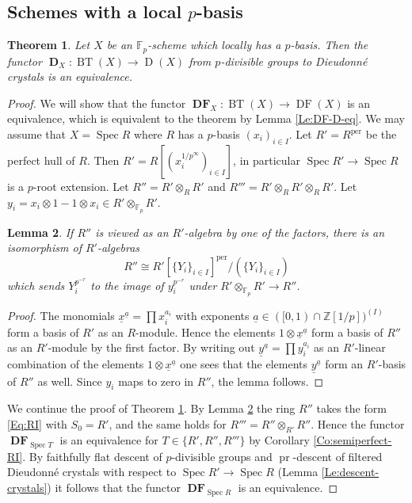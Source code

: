 \documentclass[a4paper,11pt]{article}
\theoremstyle{plain}
\newtheorem{Lemma}{Lemma}
\newtheorem{Thm}[Lemma]{Theorem}
\theoremstyle{definition}
\theoremstyle{remark}
\theoremstyle{definition}
\numberwithin{Lemma}{section}
\numberwithin{Subpoint}{Lemma}
\numberwithin{equation}{section}
\newcommand{\DD}{{\mathbb{D}}}
\newcommand{\FF}{{\mathbb{F}}}
\newcommand{\ZZ}{{\mathbb{Z}}}
\DeclareMathOperator{\BT}{BT}
\DeclareMathOperator{\Dcat}{D}
\DeclareMathOperator{\Dfun}{\mathbf D} %
\DeclareMathOperator{\DFcat}{DF}
\DeclareMathOperator{\DFfun}{\mathbf{DF}} %
\DeclareMathOperator{\Spec}{Spec}
\DeclareMathOperator{\per}{per}
\newcommand{\nameoftop}{{\operatorname{pr}}}
\renewcommand{\u}{\underline}
\newcommand{\chang}[1]{{#1}}
\begin{document}
\subsection{Schemes with a local $p$-basis}

\begin{Thm}
\label{Th:eq-p-basis}
\chang{Let $X$ be an $\FF_p$-scheme which locally has a $p$-basis.}
Then the functor
\chang{$\Dfun_X:\BT(X)\to\Dcat(X)$}
from $p$-divisible groups to Dieudonn\'e crystals is an equivalence.
\end{Thm}

\begin{proof}
\chang{We will show that the functor $\DFfun_X:\BT(X)\to\DFcat(X)$ is an equivalence, which is equivalent to the theorem by Lemma \ref{Le:DF-D-eq}.}
We may assume that $X=\Spec R$ where $R$ has a $p$-basis $(x_i)_{i\in I}$.
Let $R'=R^{\per}$ be the perfect hull of $R$.
Then $R'=R[(x_i^{1/p^\infty})_{i\in I}]$,
in particular $\Spec R'\to\Spec R$ is a $p$-root extension.
Let $R''=R'\otimes_RR'$ and $R'''=R'\otimes_RR'\otimes_RR'$.
Let $y_i=x_i\otimes 1-1\otimes x_i\in R'\otimes_{\FF_p} R'$.

\begin{Lemma}
\label{Le:R''-RI}
If $R''$ is viewed as an $R'$-algebra by one of the factors,
there is an isomorphism of $R'$-algebras
\[
R''\cong R'[\{Y_i\}_{i\in I}]^{\per}/(\{Y_i\}_{i\in I})
\]
which sends $Y_i^{p^{-r}}$ to the image of $y_i^{p^{-r}}$ 
under $R'\otimes_{\FF_p} R'\to R''$.
\end{Lemma}

\begin{proof}
The monomials $\u x^{\u a}=\prod x_i^{a_i}$ %
with exponents $\u a\in ([0,1)\cap\ZZ[1/p])^{(I)}$ %
form a basis of $R'$ as an $R$-module.
Hence the elements $1\otimes\u x^{\u a}$ form a basis of $R''$
as an $R'$-module by the first factor.
By writing out $\u y^{\u a}=\prod y_i^{a_i}$ as an $R'$-linear combination
of the elements $1\otimes\u x^{\u a}$ one sees that
the elements $\u y^{\u a}$ form an $R'$-basis of $R''$ as well.
Since $y_i$ maps to zero in $R''$, the lemma follows.
\end{proof}

We continue the proof of Theorem \ref{Th:eq-p-basis}.
By Lemma \ref{Le:R''-RI}
the ring $R''$ takes the form \eqref{Eq:RI} with $S_0=R'$,
and the same holds for $R'''=R''\otimes_{R'}R''$.
Hence the functor $\DFfun_{\Spec T}$ is an equivalence 
for $T\in\{R',R'',R'''\}$ by Corollary \ref{Co:semiperfect-RI}.
By faithfully flat descent of $p$-divisible groups and 
$\nameoftop$-descent of filtered Dieudonn\'e crystals \chang{with respect to} 
$\Spec R'\to\Spec R$ (Lemma \ref{Le:descent-crystals})
it follows that the functor $\DFfun_{\Spec R}$ is an equivalence.
\end{proof}
\end{document}
